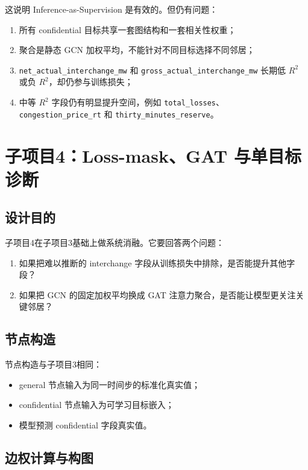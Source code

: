 \documentclass[UTF8]{ctexart}
\begin{document}
这说明 Inference-as-Supervision 是有效的。但仍有问题：
\begin{enumerate}
    \item 所有 confidential 目标共享一套图结构和一套相关性权重；
    \item 聚合是静态 GCN 加权平均，不能针对不同目标选择不同邻居；
    \item \texttt{net\_actual\_interchange\_mw} 和 \texttt{gross\_actual\_interchange\_mw}
    长期低 \(R^2\) 或负 \(R^2\)，却仍参与训练损失；
    \item 中等 \(R^2\) 字段仍有明显提升空间，例如 \texttt{total\_losses}、
    \texttt{congestion\_price\_rt} 和 \texttt{thirty\_minutes\_reserve}。
\end{enumerate}

\section{子项目4：Loss-mask、GAT 与单目标诊断}

\subsection{设计目的}

子项目4在子项目3基础上做系统消融。它要回答两个问题：
\begin{enumerate}
    \item 如果把难以推断的 interchange 字段从训练损失中排除，是否能提升其他字段？
    \item 如果把 GCN 的固定加权平均换成 GAT 注意力聚合，是否能让模型更关注关键邻居？
\end{enumerate}

\subsection{节点构造}

节点构造与子项目3相同：
\begin{itemize}
    \item general 节点输入为同一时间步的标准化真实值；
    \item confidential 节点输入为可学习目标嵌入；
    \item 模型预测 confidential 字段真实值。
\end{itemize}

\subsection{边权计算与构图}
\end{document}
